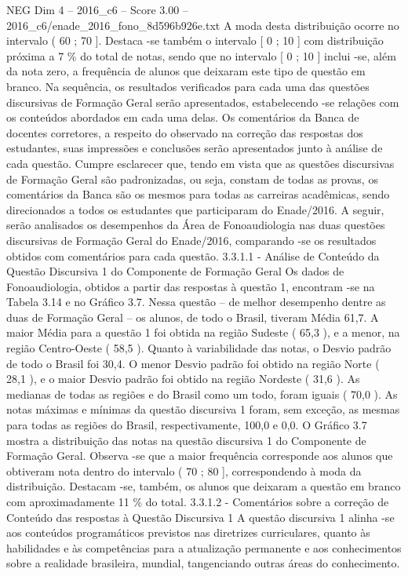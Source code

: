 \begin{textsample}{NEG Dim 4 – 2016\_c6 – Score 3.00 – 2016\_c6/enade\_2016\_fono\_8d596b926e.txt}
A moda desta distribuição ocorre no intervalo ( 60 ; 70 ].
Destaca -se também o intervalo [ 0 ; 10 ] com distribuição próxima a 7 \% do total de notas, sendo que no intervalo [ 0 ; 10 ] inclui -se, além da nota zero, a frequência de alunos que deixaram este tipo de questão em branco.
Na sequência, os resultados verificados para cada uma das questões discursivas de Formação Geral serão apresentados, estabelecendo -se relações com os conteúdos abordados em cada uma delas.
Os comentários da Banca de docentes corretores, a respeito do observado na correção das respostas dos estudantes, suas impressões e conclusões serão apresentados junto à análise de cada questão.
Cumpre esclarecer que, tendo em vista que as questões discursivas de Formação Geral são padronizadas, ou seja, constam de todas as provas, os comentários da Banca são os mesmos para todas as carreiras acadêmicas, sendo direcionados a todos os estudantes que participaram do Enade/2016.
A seguir, serão analisados os desempenhos da Área de Fonoaudiologia nas duas questões discursivas de Formação Geral do Enade/2016, comparando -se os resultados obtidos com comentários para cada questão. 3.3.1.1 - Análise de Conteúdo da Questão Discursiva 1 do Componente de Formação Geral Os dados de Fonoaudiologia, obtidos a partir das respostas à questão 1, encontram -se na Tabela 3.14 e no Gráfico 3.7.
Nessa questão – de melhor desempenho dentre as duas de Formação Geral – os alunos, de todo o Brasil, tiveram Média 61,7.
A maior Média para a questão 1 foi obtida na região Sudeste ( 65,3 ), e a menor, na região Centro-Oeste ( 58,5 ).
Quanto à variabilidade das notas, o Desvio padrão de todo o Brasil foi 30,4.
O menor Desvio padrão foi obtido na região Norte ( 28,1 ), e o maior Desvio padrão foi obtido na região Nordeste ( 31,6 ).
As medianas de todas as regiões e do Brasil como um todo, foram iguais ( 70,0 ).
As notas máximas e mínimas da questão discursiva 1 foram, sem exceção, as mesmas para todas as regiões do Brasil, respectivamente, 100,0 e 0,0.
O Gráfico 3.7 mostra a distribuição das notas na questão discursiva 1 do Componente de Formação Geral.
Observa -se que a maior frequência corresponde aos alunos que obtiveram nota dentro do intervalo ( 70 ; 80 ], correspondendo à moda da distribuição.
Destacam -se, também, os alunos que deixaram a questão em branco com aproximadamente 11 \% do total. 3.3.1.2 - Comentários sobre a correção de Conteúdo das respostas à Questão Discursiva 1 A questão discursiva 1 alinha -se aos conteúdos programáticos previstos nas diretrizes curriculares, quanto às habilidades e às competências para a atualização permanente e aos conhecimentos sobre a realidade brasileira, mundial, tangenciando outras áreas do conhecimento.

\end{textsample}

